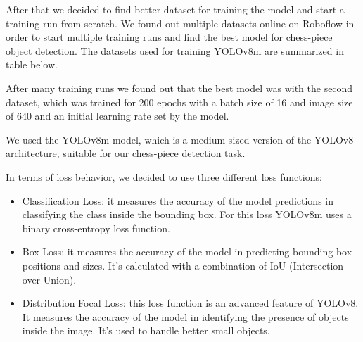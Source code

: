 After that we decided to find better dataset for training the model and start a training run from scratch.
We found out multiple datasets online on Roboflow in order to start multiple training runs and find the best model for chess-piece object detection.
The datasets used for training YOLOv8m are summarized in table below.
\begin{table}[ht]
\centering
\caption{Datasets used for training YOLOv8m.}
\label{tab:YOLOv8-datasets}
\end{table}

After many training runs we found out that the best model was with the second dataset,
which was trained for 200 epochs with a batch size of 16 and image size of 640 and an initial learning rate set by the model.

We used the YOLOv8m model, which is a medium-sized version of the YOLOv8 architecture, suitable for our chess-piece detection task.

In terms of loss behavior, we decided to use three different loss functions:
\begin{itemize}
    \item Classification Loss: it measures the accuracy of the model predictions in classifying the class inside the bounding box.
    For this loss YOLOv8m uses a binary cross-entropy loss function.
    \item Box Loss: it measures the accuracy of the model in predicting bounding box positions and sizes. It's calculated with a combination of IoU (Intersection over Union).
    \item Distribution Focal Loss: this loss function is an advanced feature of YOLOv8. It measures the accuracy of the model in identifying the presence of objects inside the image. It's used to handle better small objects.
\end{itemize}

